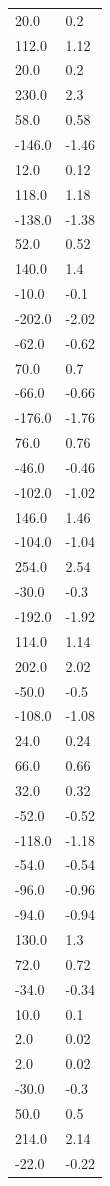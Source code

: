 \begin{longtable}{ll}
20.0 & 0.2 \\
112.0 & 1.12 \\
20.0 & 0.2 \\
230.0 & 2.3 \\
58.0 & 0.58 \\
-146.0 & -1.46 \\
12.0 & 0.12 \\
118.0 & 1.18 \\
-138.0 & -1.38 \\
52.0 & 0.52 \\
140.0 & 1.4 \\
-10.0 & -0.1 \\
-202.0 & -2.02 \\
-62.0 & -0.62 \\
70.0 & 0.7 \\
-66.0 & -0.66 \\
-176.0 & -1.76 \\
76.0 & 0.76 \\
-46.0 & -0.46 \\
-102.0 & -1.02 \\
146.0 & 1.46 \\
-104.0 & -1.04 \\
254.0 & 2.54 \\
-30.0 & -0.3 \\
-192.0 & -1.92 \\
114.0 & 1.14 \\
202.0 & 2.02 \\
-50.0 & -0.5 \\
-108.0 & -1.08 \\
24.0 & 0.24 \\
66.0 & 0.66 \\
32.0 & 0.32 \\
-52.0 & -0.52 \\
-118.0 & -1.18 \\
-54.0 & -0.54 \\
-96.0 & -0.96 \\
-94.0 & -0.94 \\
130.0 & 1.3 \\
72.0 & 0.72 \\
-34.0 & -0.34 \\
10.0 & 0.1 \\
2.0 & 0.02 \\
2.0 & 0.02 \\
-30.0 & -0.3 \\
50.0 & 0.5 \\
214.0 & 2.14 \\
-22.0 & -0.22 \\

\end{longtable}
